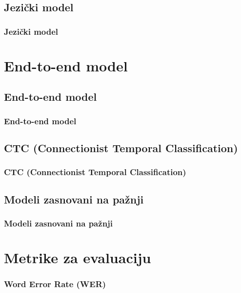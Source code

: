 \documentclass{beamer}
\begin{document}
\subsection{Jezički model}
\begin{frame}
    \frametitle{Jezički model}
\end{frame}

\section{End-to-end model}

\subsection{End-to-end model}
\begin{frame}
    \frametitle{End-to-end model}
\end{frame}

\subsection{CTC (Connectionist Temporal Classification)}
\begin{frame}
    \frametitle{CTC (Connectionist Temporal Classification)}
\end{frame}

\subsection{Modeli zasnovani na pažnji}
\begin{frame}
    \frametitle{Modeli zasnovani na pažnji}
\end{frame}

\section{Metrike za evaluaciju}
\begin{frame}
    \frametitle{Word Error Rate (WER)}
\end{frame}



%      
%     
\end{document}
